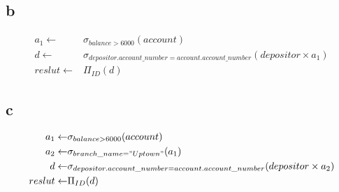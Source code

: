 \documentclass{article}
\begin{document}
    \subsection*{b} 
    \begin{equation*}
        \begin{split}
            a_1\leftarrow & \sigma_{balance>6000}(account)\\
            d\leftarrow & \sigma_{depositor.account\_number=account.account\_number}(depositor\times a_1)\\
            reslut\leftarrow & \Pi_{ID}(d)
        \end{split}
    \end{equation*}
    \subsection*{c}
    \begin{equation*}
        \begin{split}
            a_1\leftarrow & \sigma_{balance>6000}(account)\\
            a_2\leftarrow & \sigma_{branch\_name="Uptown"}(a_1)\\
            d\leftarrow & \sigma_{depositor.account\_number=account.account\_number}(depositor\times a_2)\\
            reslut\leftarrow & \Pi_{ID}(d)
        \end{split}
    \end{equation*}
\end{document}
